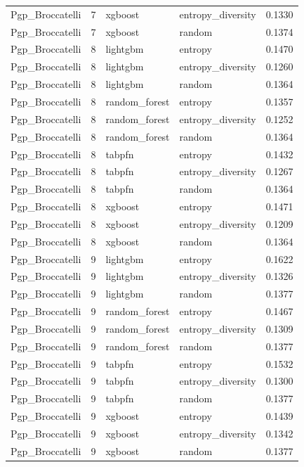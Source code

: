 \begin{tabular}{lrllr}
Pgp_Broccatelli & 7 & xgboost & entropy_diversity & 0.1330 \\
Pgp_Broccatelli & 7 & xgboost & random & 0.1374 \\
Pgp_Broccatelli & 8 & lightgbm & entropy & 0.1470 \\
Pgp_Broccatelli & 8 & lightgbm & entropy_diversity & 0.1260 \\
Pgp_Broccatelli & 8 & lightgbm & random & 0.1364 \\
Pgp_Broccatelli & 8 & random_forest & entropy & 0.1357 \\
Pgp_Broccatelli & 8 & random_forest & entropy_diversity & 0.1252 \\
Pgp_Broccatelli & 8 & random_forest & random & 0.1364 \\
Pgp_Broccatelli & 8 & tabpfn & entropy & 0.1432 \\
Pgp_Broccatelli & 8 & tabpfn & entropy_diversity & 0.1267 \\
Pgp_Broccatelli & 8 & tabpfn & random & 0.1364 \\
Pgp_Broccatelli & 8 & xgboost & entropy & 0.1471 \\
Pgp_Broccatelli & 8 & xgboost & entropy_diversity & 0.1209 \\
Pgp_Broccatelli & 8 & xgboost & random & 0.1364 \\
Pgp_Broccatelli & 9 & lightgbm & entropy & 0.1622 \\
Pgp_Broccatelli & 9 & lightgbm & entropy_diversity & 0.1326 \\
Pgp_Broccatelli & 9 & lightgbm & random & 0.1377 \\
Pgp_Broccatelli & 9 & random_forest & entropy & 0.1467 \\
Pgp_Broccatelli & 9 & random_forest & entropy_diversity & 0.1309 \\
Pgp_Broccatelli & 9 & random_forest & random & 0.1377 \\
Pgp_Broccatelli & 9 & tabpfn & entropy & 0.1532 \\
Pgp_Broccatelli & 9 & tabpfn & entropy_diversity & 0.1300 \\
Pgp_Broccatelli & 9 & tabpfn & random & 0.1377 \\
Pgp_Broccatelli & 9 & xgboost & entropy & 0.1439 \\
Pgp_Broccatelli & 9 & xgboost & entropy_diversity & 0.1342 \\
Pgp_Broccatelli & 9 & xgboost & random & 0.1377 \\
\bottomrule
\end{tabular}
